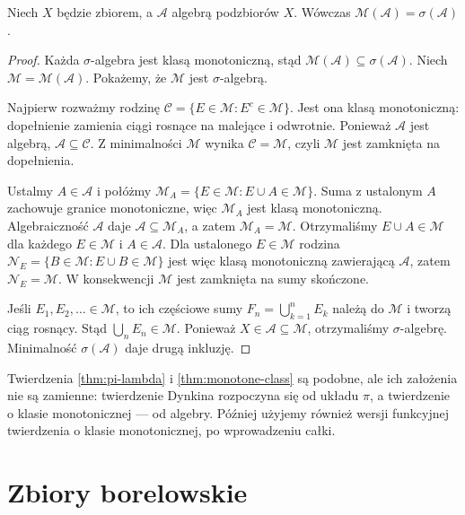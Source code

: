 \begin{twierdzenie}
\label{thm:monotone-class}
Niech $X$ będzie zbiorem, a $\mathcal A$ algebrą podzbiorów $X$.
Wówczas $\mathcal M(\mathcal A)=\sigma(\mathcal A)$.
\end{twierdzenie}
\begin{proof}
Każda $\sigma$-algebra jest klasą monotoniczną, stąd
$\mathcal M(\mathcal A)\subseteq\sigma(\mathcal A)$.
Niech $\mathcal M=\mathcal M(\mathcal A)$. Pokażemy, że $\mathcal M$
jest $\sigma$-algebrą.

Najpierw rozważmy rodzinę
$\mathcal C=\{E\in\mathcal M:E^c\in\mathcal M\}$.
Jest ona klasą monotoniczną: dopełnienie zamienia ciągi rosnące
na malejące i odwrotnie. Ponieważ $\mathcal A$ jest algebrą,
$\mathcal A\subseteq\mathcal C$. Z minimalności $\mathcal M$
wynika $\mathcal C=\mathcal M$, czyli $\mathcal M$ jest zamknięta
na dopełnienia.

Ustalmy $A\in\mathcal A$ i połóżmy
$\mathcal M_A=\{E\in\mathcal M:E\cup A\in\mathcal M\}$.
Suma z ustalonym $A$ zachowuje granice monotoniczne, więc
$\mathcal M_A$ jest klasą monotoniczną. Algebraiczność $\mathcal A$
daje $\mathcal A\subseteq\mathcal M_A$, a zatem
$\mathcal M_A=\mathcal M$. Otrzymaliśmy
$E\cup A\in\mathcal M$ dla każdego $E\in\mathcal M$ i $A\in\mathcal A$.
Dla ustalonego $E\in\mathcal M$ rodzina
$\mathcal N_E=\{B\in\mathcal M:E\cup B\in\mathcal M\}$
jest więc klasą monotoniczną zawierającą $\mathcal A$, zatem
$\mathcal N_E=\mathcal M$. W konsekwencji $\mathcal M$ jest zamknięta
na sumy skończone.

Jeśli $E_1,E_2,\ldots\in\mathcal M$, to ich częściowe sumy
$F_n=\bigcup_{k=1}^nE_k$ należą do $\mathcal M$ i tworzą ciąg
rosnący. Stąd $\bigcup_nE_n\in\mathcal M$. Ponieważ
$X\in\mathcal A\subseteq\mathcal M$, otrzymaliśmy $\sigma$-algebrę.
Minimalność $\sigma(\mathcal A)$ daje drugą inkluzję.
\end{proof}

\begin{uwaga}
Twierdzenia \ref{thm:pi-lambda} i \ref{thm:monotone-class} są podobne,
ale ich założenia nie są zamienne: twierdzenie Dynkina rozpoczyna się
od układu $\pi$, a twierdzenie o klasie monotonicznej --- od algebry.
Później użyjemy również wersji funkcyjnej twierdzenia o klasie
monotonicznej, po wprowadzeniu całki.
\end{uwaga}

\section{Zbiory borelowskie}

